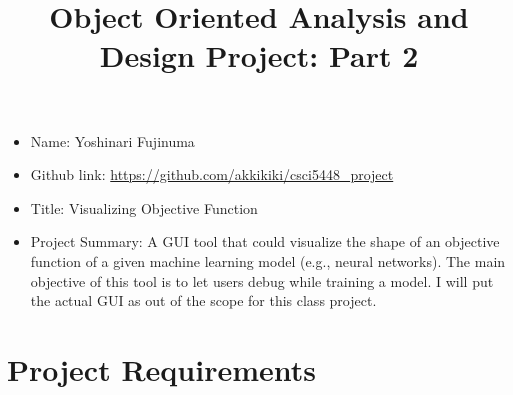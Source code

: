 \documentclass[11pt]{article}
\begin{document}
\vspace{-1cm}
\title{\vspace{-2ex} Object Oriented Analysis and Design Project: Part 2\vspace{-2ex}}
\date{\vspace{-6ex}}
\maketitle


\begin{itemize}
 \item Name: Yoshinari Fujinuma
 \item Github link: \url{https://github.com/akkikiki/csci5448_project}
 \item Title: Visualizing Objective Function
 \item Project Summary: A GUI tool that could visualize the shape of an objective function of a given machine learning model (e.g., neural networks). The main objective of this tool is to let users debug while training a model. I will put the actual GUI as out of the scope for this class project. 
\end{itemize}


\section{Project Requirements}
\end{document}
